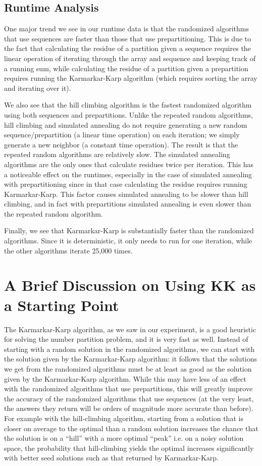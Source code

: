 \documentclass[10pt,letter]{article}
\begin{document}
\subsection{Runtime Analysis}

One major trend we see in our runtime data is that the randomized algorithms that use sequences are faster than those that use prepartitioning. This is due to the fact that calculating the residue of a partition given a sequence requires the linear operation of iterating through the array and sequence and keeping track of a running sum, while calculating the residue of a partition given a prepartition requires running the Karmarkar-Karp algorithm (which requires sorting the array and iterating over it).

We also see that the hill climbing algorithm is the fastest randomized algorithm using both sequences and prepartitions. Unlike the repeated random algorithms, hill climbing and simulated annealing do not require generating a new random sequence/prepartition (a linear time operation) on each iteration; we simply generate a new neighbor (a constant time operation). The result is that the repeated random algorithms are relatively slow. The simulated annealing algorithms are the only ones that calculate residues twice per iteration. This has a noticeable effect on the runtimes, especially in the case of simulated annealing with prepartitioning since in that case calculating the residue requires running Karmarkar-Karp. This factor causes simulated annealing to be slower than hill climbing, and in fact with prepartitions simulated annealing is even slower than the repeated random algorithm.

Finally, we see that Karmarkar-Karp is substantially faster than the randomized algorithms. Since it is deterministic, it only needs to run for one iteration, while the other algorithms iterate 25,000 times.

\section{A Brief Discussion on Using KK as a Starting Point}

The Karmarkar-Karp algorithm, as we saw in our experiment, is a good heuristic for solving the number partition problem, and it is very fast as well. Instead of starting with a random solution in the randomized algorithms, we can start with the solution given by the Karmarkar-Karp algorithm: it follows that the solutions we get from the randomized algorithms must be at least as good as the solution given by the Karmarkar-Karp algorithm. While this may have less of an effect with the randomized algorithms that use prepartitions, this will greatly improve the accuracy of the randomized algorithms that use sequences (at the very least, the answers they return will be orders of magnitude more accurate than before). For example with the hill-climbing algorithm, starting from a solution that is closer on average to the optimal than a random solution increases the chance that the solution is on a ``hill'' with a more optimal ``peak'' i.e. on a noisy solution space, the probability that hill-climbing yields the optimal increases significantly with better seed solutions such as that returned by Karmarkar-Karp.
\end{document}
